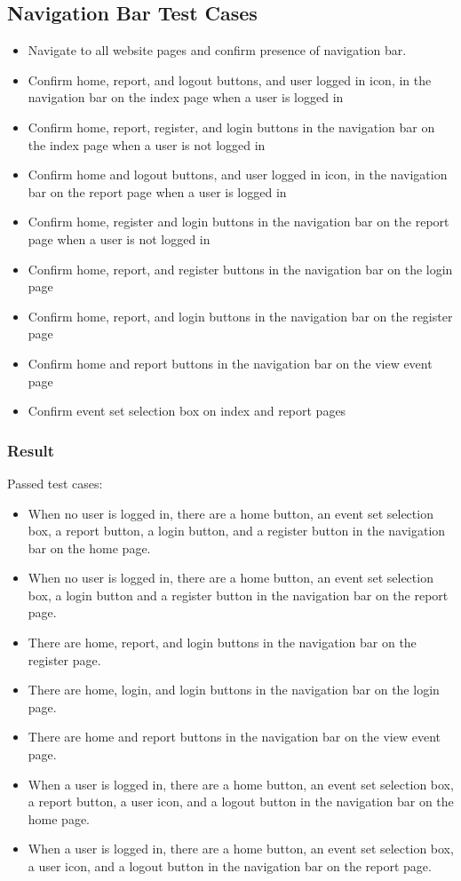 \subsection{Navigation Bar Test Cases}
\begin{itemize}
\item Navigate to all website pages and confirm presence of navigation bar.
\item Confirm home, report, and logout buttons, and user logged in icon, in the navigation bar on the index page when a user is logged in
\item Confirm home, report, register, and login buttons in the navigation bar on the index page when a user is not logged in 
\item Confirm home and logout buttons, and user logged in icon, in the navigation bar on the report page when a user is logged in
\item Confirm home, register and login buttons in the navigation bar on the report page when a user is not logged in
\item Confirm home, report, and register buttons in the navigation bar on the login page
\item Confirm home, report, and login buttons in the navigation bar on the register page
\item Confirm home and report buttons in the navigation bar on the view event page
\item Confirm event set selection box on index and report pages
 \end{itemize}
\subsubsection{Result}
Passed test cases:
\begin{itemize}
\item When no user is logged in, there are a home button, an event set selection box, a report button, a login button, and a register button in the navigation bar on the home page.
\item When no user is logged in, there are a home button, an event set selection box, a login button and a register button in the navigation bar on the report page.
\item There are home, report, and login buttons in the navigation bar on the register page.
\item There are home, login, and login buttons in the navigation bar on the login page.
\item There are home and report buttons in the navigation bar on the view event page.
\item When a user is logged in, there are a home button, an event set selection box, a report button, a user icon, and a logout button in the navigation bar on the home page.
\item When a user is logged in, there are a home button, an event set selection box, a user icon, and a logout button in the navigation bar on the report page.
 \end{itemize}
